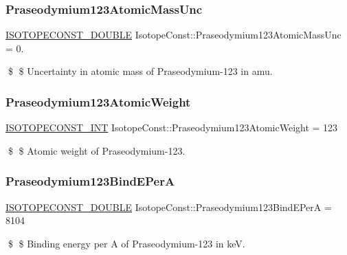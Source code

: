 \subsubsection{\texorpdfstring{Praseodymium123\+Atomic\+Mass\+Unc}{Praseodymium123AtomicMassUnc}}
{\footnotesize\ttfamily \mbox{\hyperlink{group___isotope_const-_macros_ga8f45a7272ce02c0b4c65c44636ed719a}{I\+S\+O\+T\+O\+P\+E\+C\+O\+N\+S\+T\+\_\+\+D\+O\+U\+B\+LE}} Isotope\+Const\+::\+Praseodymium123\+Atomic\+Mass\+Unc = 0.}

\$ \$ Uncertainty in atomic mass of Praseodymium-\/123 in amu. \mbox{\label{group___isotope_const-_praseodymium-_pr123_ga0c909bdea42b7c28da46ac07062c5cfb}} 
\subsubsection{\texorpdfstring{Praseodymium123\+Atomic\+Weight}{Praseodymium123AtomicWeight}}
{\footnotesize\ttfamily \mbox{\hyperlink{group___isotope_const-_macros_ga5f18360b3e99483a35c32d789e62621c}{I\+S\+O\+T\+O\+P\+E\+C\+O\+N\+S\+T\+\_\+\+I\+NT}} Isotope\+Const\+::\+Praseodymium123\+Atomic\+Weight = 123}

\$ \$ Atomic weight of Praseodymium-\/123. \mbox{\label{group___isotope_const-_praseodymium-_pr123_gaf5fc38fd76c922c16e22cec490d724e6}} 
\subsubsection{\texorpdfstring{Praseodymium123\+Bind\+E\+PerA}{Praseodymium123BindEPerA}}
{\footnotesize\ttfamily \mbox{\hyperlink{group___isotope_const-_macros_ga8f45a7272ce02c0b4c65c44636ed719a}{I\+S\+O\+T\+O\+P\+E\+C\+O\+N\+S\+T\+\_\+\+D\+O\+U\+B\+LE}} Isotope\+Const\+::\+Praseodymium123\+Bind\+E\+PerA = 8104}

\$ \$ Binding energy per A of Praseodymium-\/123 in keV. \mbox{\label{group___isotope_const-_praseodymium-_pr123_ga8c72e96c750465a902b0e2b822881959}} 
